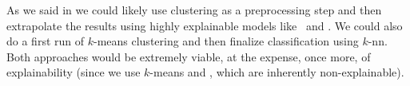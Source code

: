 As we said in  we could likely use clustering as a preprocessing step and then
extrapolate the results using highly explainable models like \dts\ and \rfs. We could also do a
first run of $k$-means clustering and then finalize classification using $k$-nn. Both approaches
would be extremely viable, at the expense, once more, of explainability (since we use $k$-means and
\pca, which are inherently non-explainable).




